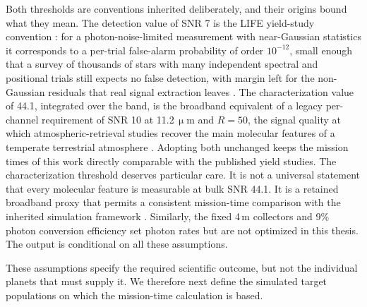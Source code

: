 \documentclass[12pt,a4paper]{article}
\numberwithin{equation}{section}
\numberwithin{figure}{section}
\numberwithin{table}{section}
\begin{document}
Both thresholds are conventions inherited deliberately, and their origins bound what they mean. The detection value of SNR 7 is the LIFE yield-study convention \cite{quanz2022life1, kammerer2022life6}: for a photon-noise-limited measurement with near-Gaussian statistics it corresponds to a per-trial false-alarm probability of order $10^{-12}$, small enough that a survey of thousands of stars with many independent spectral and positional trials still expects no false detection, with margin left for the non-Gaussian residuals that real signal extraction leaves \cite{dannert2022life2}. The characterization value of 44.1, integrated over the band, is the broadband equivalent of a legacy per-channel requirement of SNR 10 at 11.2\,$\upmu$m and $R=50$, the signal quality at which atmospheric-retrieval studies recover the main molecular features of a temperate terrestrial atmosphere \cite{konrad2022life3}. Adopting both unchanged keeps the mission times of this work directly comparable with the published yield studies. The characterization threshold deserves particular care. It is not a universal statement that every molecular feature is measurable at bulk SNR 44.1. It is a retained broadband proxy that permits a consistent mission-time comparison with the inherited simulation framework \cite{dannert2025thesis}. Similarly, the fixed 4\,m collectors and 9\% photon conversion efficiency set photon rates but are not optimized in this thesis. The output is conditional on all these assumptions.

These assumptions specify the required scientific outcome, but not the individual planets that must supply it. We therefore next define the simulated target populations on which the mission-time calculation is based.
\end{document}
